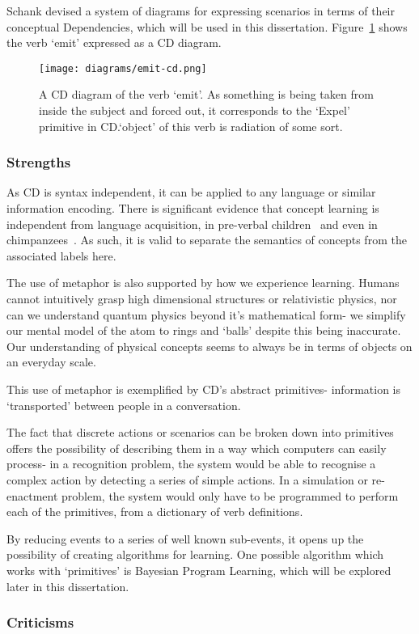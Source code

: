 \documentclass[dissertation.tex]{subfiles}
\begin{document}
    Schank devised a system of diagrams for expressing scenarios in terms of their conceptual Dependencies, which will be used in this dissertation. Figure~\ref{fig:emit-cd} shows the verb `emit' expressed as a CD diagram.
    \begin{figure}
        \centerline{
            \texttt{[image: diagrams/emit-cd.png]}
        }
        \caption{A CD diagram of the verb `emit'. As something is being taken from inside the subject and forced out, it corresponds to the `Expel' primitive in CD.\@The `object' of this verb is radiation of some sort.}\label{fig:emit-cd}
    \end{figure}

    \subsubsection{Strengths}
    As CD is syntax independent, it can be applied to any language or similar information encoding. There is significant evidence that concept learning is independent from language acquisition, in pre-verbal children~\cite{mandler-canovas2014imageschemas} and even in chimpanzees~\cite{Dahl-Adachi2013chimpanzees}. As such, it is valid to separate the semantics of concepts from the associated labels here.

    The use of metaphor is also supported by how we experience learning. Humans cannot intuitively grasp high dimensional structures or relativistic physics, nor can we understand quantum physics beyond it's mathematical form- we simplify our mental model of the atom to rings and `balls' despite this being inaccurate. Our understanding of physical concepts seems to always be in terms of objects on an everyday scale.

    This use of metaphor is exemplified by CD's abstract primitives- information is `transported' between people in a conversation.

    The fact that discrete actions or scenarios can be broken down into primitives offers the possibility of describing them in a way which computers can easily process- in a recognition problem, the system would be able to recognise a complex action by detecting a series of simple actions. In a simulation or re-enactment problem, the system would only have to be programmed to perform each of the primitives, from a dictionary of verb definitions.

    By reducing events to a series of well known sub-events, it opens up the possibility of creating algorithms for learning. One possible algorithm which works with `primitives' is Bayesian Program Learning, which will be explored later in this dissertation. %

    \subsubsection{Criticisms}

    
    
\end{document}
